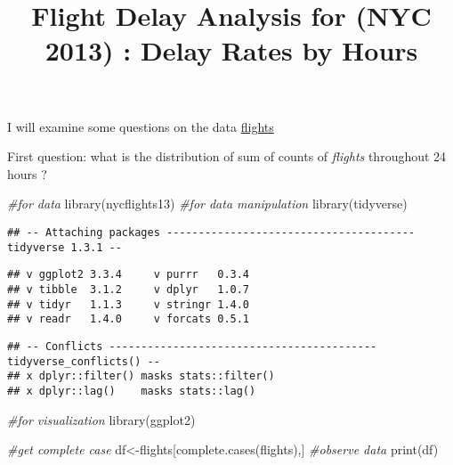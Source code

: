 \documentclass[
]{article}
\title{Flight Delay Analysis for (NYC 2013) : Delay Rates by Hours}
\author{}
\date{\vspace{-2.5em}}
\newenvironment{Shaded}{\begin{snugshade}}{\end{snugshade}}
\newcommand{\CommentTok}[1]{\textcolor[rgb]{0.56,0.35,0.01}{\textit{#1}}}
\newcommand{\FunctionTok}[1]{\textcolor[rgb]{0.00,0.00,0.00}{#1}}
\newcommand{\NormalTok}[1]{#1}
\newcommand{\OtherTok}[1]{\textcolor[rgb]{0.56,0.35,0.01}{#1}}
\begin{document}
\maketitle

I will examine some questions on the data
\href{https://cran.r-project.org/web/packages/nycflights13/nycflights13.pdf}{flights}

First question: what is the distribution of sum of counts of
\emph{flights} throughout 24 hours ?

\begin{Shaded}
\begin{Highlighting}[]
\CommentTok{\#for data}
\FunctionTok{library}\NormalTok{(nycflights13)}
\CommentTok{\#for data manipulation}
\FunctionTok{library}\NormalTok{(tidyverse)}
\end{Highlighting}
\end{Shaded}

\begin{verbatim}
## -- Attaching packages --------------------------------------- tidyverse 1.3.1 --
\end{verbatim}

\begin{verbatim}
## v ggplot2 3.3.4     v purrr   0.3.4
## v tibble  3.1.2     v dplyr   1.0.7
## v tidyr   1.1.3     v stringr 1.4.0
## v readr   1.4.0     v forcats 0.5.1
\end{verbatim}

\begin{verbatim}
## -- Conflicts ------------------------------------------ tidyverse_conflicts() --
## x dplyr::filter() masks stats::filter()
## x dplyr::lag()    masks stats::lag()
\end{verbatim}

\begin{Shaded}
\begin{Highlighting}[]
\CommentTok{\#for visualization}
\FunctionTok{library}\NormalTok{(ggplot2)}

\CommentTok{\#get complete case }
\NormalTok{df}\OtherTok{\textless{}{-}}\NormalTok{flights[}\FunctionTok{complete.cases}\NormalTok{(flights),]}
\CommentTok{\#observe data}
\FunctionTok{print}\NormalTok{(df)}
\end{Highlighting}
\end{Shaded}
\end{document}
